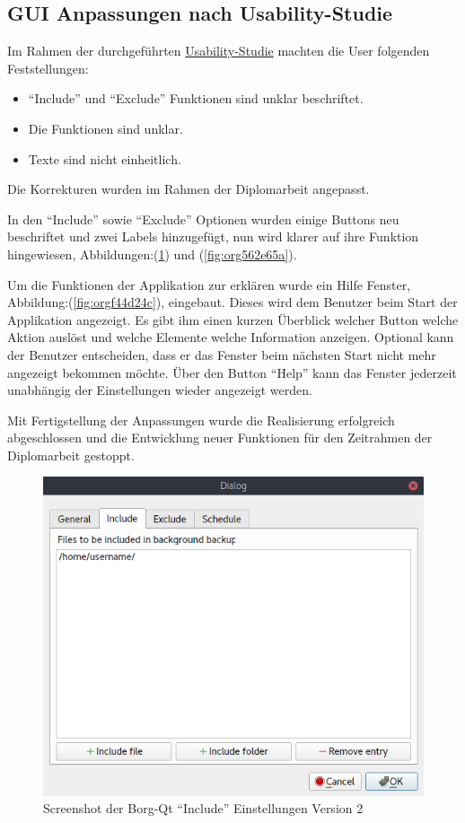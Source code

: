 \subsection{GUI Anpassungen nach Usability-Studie}
\label{sec:org7b2251d}

Im Rahmen der durchgeführten \hyperref[sec:org4a36f83]{Usability-Studie} machten die User folgenden
Feststellungen:
\begin{itemize}
\item "`Include"' und "`Exclude"' Funktionen sind unklar beschriftet.
\item Die Funktionen sind unklar.
\item Texte sind nicht einheitlich.
\end{itemize}

Die Korrekturen wurden im Rahmen der Diplomarbeit angepasst.

In den "`Include"' sowie "`Exclude"' Optionen wurden einige Buttons neu beschriftet
und zwei Labels hinzugefügt, nun wird klarer auf ihre Funktion hingewiesen,
Abbildungen:(\ref{fig:org7af081d}) und
(\ref{fig:org562e65a}).

Um die Funktionen der Applikation zur erklären wurde ein Hilfe Fenster,
Abbildung:(\ref{fig:orgf44d24c}), eingebaut. Dieses wird dem Benutzer beim Start der
Applikation angezeigt. Es gibt ihm einen kurzen Überblick welcher Button welche
Aktion auslöst und welche Elemente welche Information anzeigen. Optional kann
der Benutzer entscheiden, dass er das Fenster beim nächsten Start nicht mehr
angezeigt bekommen möchte. Über den Button "`Help"' kann das Fenster jederzeit
unabhängig der Einstellungen wieder angezeigt werden.

Mit Fertigstellung der Anpassungen wurde die Realisierung erfolgreich
abgeschlossen und die Entwicklung neuer Funktionen für den Zeitrahmen der
Diplomarbeit gestoppt.

\newpage
\begin{figure}[H]
\centering
\includegraphics[height=.40\textheight]{pictures/borgqt_settings_include_v2.png}
\caption{\label{fig:org7af081d}
Screenshot der Borg-Qt "`Include"' Einstellungen Version 2}
\end{figure}

